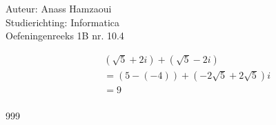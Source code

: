 \documentclass[a4paper]{article}
\begin{document}
  
\noindent \large Auteur: Anass Hamzaoui \\
\noindent \large Studierichting: Informatica\\
\noindent \large Oefeningenreeks 1B nr. 10.4\\  

\medskip

\normalsize

\begin{eqnarray*}
    && (\sqrt{5} + 2i) + (\sqrt{5} - 2i) \\
    && = (5 - (-4)) + (-2\sqrt{5} + 2\sqrt{5})i \\
    && = 9 \\
\end{eqnarray*}

\begin{thebibliography}{999}
\end{thebibliography}
\end{document}
